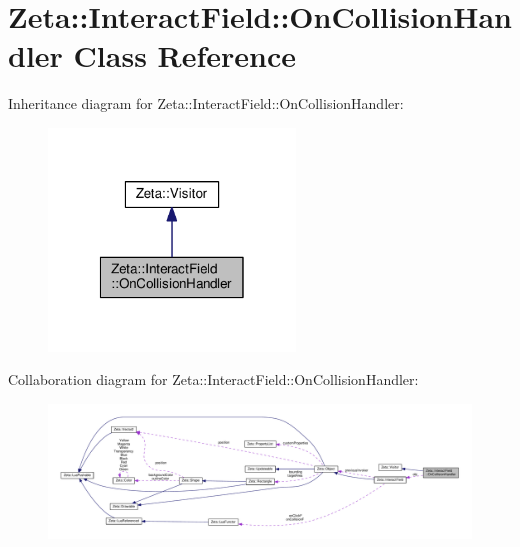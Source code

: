 \hypertarget{classZeta_1_1InteractField_1_1OnCollisionHandler}{\section{Zeta\+:\+:Interact\+Field\+:\+:On\+Collision\+Handler Class Reference}
\label{classZeta_1_1InteractField_1_1OnCollisionHandler}
}


Inheritance diagram for Zeta\+:\+:Interact\+Field\+:\+:On\+Collision\+Handler\+:\nopagebreak
\begin{figure}[H]
\begin{center}
\leavevmode
\includegraphics[width=186pt]{classZeta_1_1InteractField_1_1OnCollisionHandler__inherit__graph}
\end{center}
\end{figure}


Collaboration diagram for Zeta\+:\+:Interact\+Field\+:\+:On\+Collision\+Handler\+:\nopagebreak
\begin{figure}[H]
\begin{center}
\leavevmode
\includegraphics[width=350pt]{classZeta_1_1InteractField_1_1OnCollisionHandler__coll__graph}
\end{center}
\end{figure}
